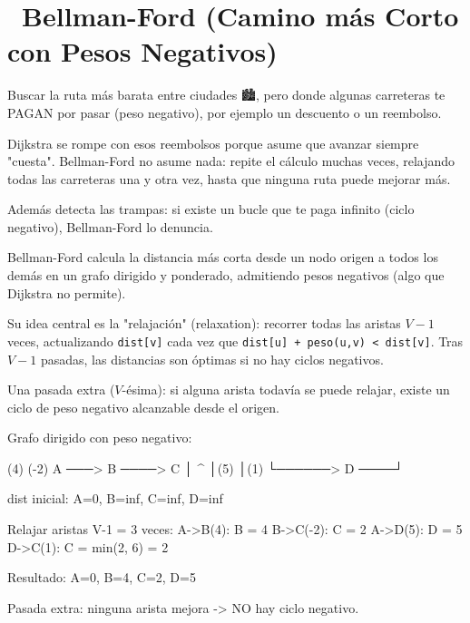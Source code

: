 \chapter[\emj{💸}~Bellman-Ford (Camino más Corto con Pesos Negativos)]{~Bellman-Ford (Camino más Corto con Pesos Negativos)}

\begin{dsaquees}

Buscar la ruta más barata entre ciudades 🏙️, pero donde algunas
carreteras te PAGAN por pasar (peso negativo), por ejemplo un descuento
o un reembolso.

Dijkstra se rompe con esos reembolsos porque asume que avanzar siempre
"cuesta". Bellman-Ford no asume nada: repite el cálculo muchas veces,
relajando todas las carreteras una y otra vez, hasta que ninguna ruta
puede mejorar más.

Además detecta las trampas: si existe un bucle que te paga infinito
(ciclo negativo), Bellman-Ford lo denuncia.

\end{dsaquees}

\begin{dsaotraforma}

Bellman-Ford calcula la distancia más corta desde un nodo origen a
todos los demás en un grafo dirigido y ponderado, admitiendo pesos
negativos (algo que Dijkstra no permite).

Su idea central es la "relajación" (relaxation): recorrer todas las
aristas $V-1$ veces, actualizando \verb|dist[v]| cada vez que
\verb|dist[u] + peso(u,v) < dist[v]|. Tras $V-1$ pasadas, las distancias
son óptimas si no hay ciclos negativos.

Una pasada extra ($V$-ésima): si alguna arista todavía se puede relajar,
existe un ciclo de peso negativo alcanzable desde el origen.

\end{dsaotraforma}

\begin{dsadiagrama}
Grafo dirigido con peso negativo:

   (4)      (-2)
 A ───> B ────> C
 │              ^
 │(5)           │(1)
 └──────> D ────┘

dist inicial: A=0, B=inf, C=inf, D=inf

Relajar aristas V-1 = 3 veces:
  A->B(4): B = 4
  B->C(-2): C = 2
  A->D(5): D = 5
  D->C(1): C = min(2, 6) = 2

Resultado: A=0, B=4, C=2, D=5

Pasada extra: ninguna arista mejora -> NO hay ciclo negativo.
\end{dsadiagrama}

